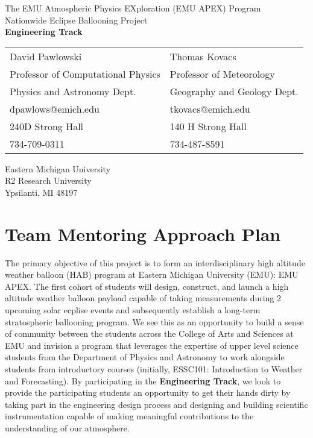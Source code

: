 \documentclass[12pt]{article}
\begin{document}
\Large
\begin{center}
The EMU Atmospheric Physics EXploration (EMU APEX) Program\\
\large
\vspace{2cm}
Nationwide Eclipse Ballooning Project\\
{\bf Engineering Track}
\vspace{1in}

\normalsize
\begin{table}[h]
\centering

  \begin{tabular}{ll}
  David Pawlowski&Thomas Kovacs\\
  Professor of Computational Physics&Professor of Meteorology\\
    Physics and Astronomy Dept.&Geography and Geology Dept.\\
  dpawlows@emich.edu&tkovacs@emich.edu\\
  240D Strong Hall&140 H Strong Hall\\
  734-709-0311&734-487-8591

  \end{tabular}
\end{table}


Eastern Michigan University\\
 R2 Research University\\
Ypsilanti, MI 48197
\end{center}

\small\normalsize
\newpage
\tableofcontents

\newpage
\section{Team Mentoring Approach Plan}
The primary objective of this project is to form an interdisciplinary
high altitude weather balloon (HAB) program at Eastern Michigan University (EMU): EMU APEX.
The first cohort of students will design, construct, and launch a
high altitude weather balloon payload
capable of taking measurements during 2 upcoming solar ecplise events and subsequently
establish a long-term stratospheric ballooning program. We see this as an opportunity to build a sense of
community between the students across the College of Arts and Sciences at EMU and invision a program
that leverages the expertise of upper level science students from the Department of Physics and Astronomy
to work alongside students from introductory courses (initially, ESSC101:
Introduction to Weather and Forecasting). By participating in the {\bf Engineering Track}, we look to
provide the participating students an opportunity to get their hands dirty by taking part in the
engineering design process and designing and building scientific instrumentation capable of making
meaningful contributions to the understanding of our atmosphere.
\end{document}
